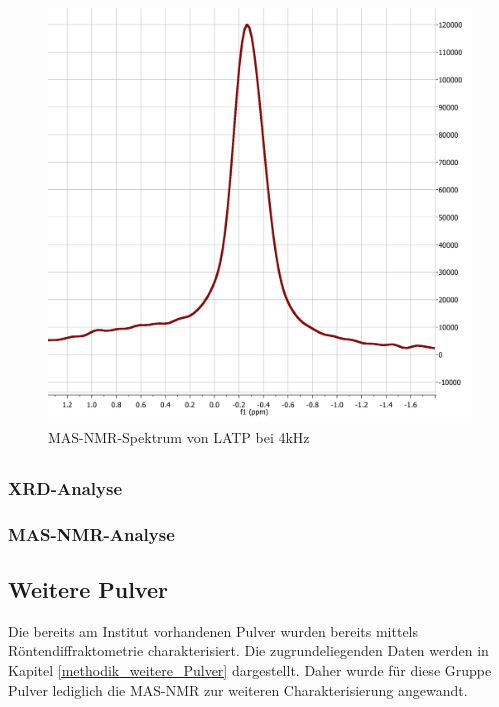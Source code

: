 \documentclass[a4paper, 11pt, headsepline,footsepline,twoside,abstract]{scrbook}
\begin{document}
\begin{figure}
	\centering
	\includegraphics[width=1.0\columnwidth]{images/P410.png}
	\caption{MAS-NMR-Spektrum von LATP bei 4kHz}
	\label{nmr_mas_LATP2}
\end{figure}
\newpage
\subsection{}
\subsubsection{XRD-Analyse}
\subsubsection{MAS-NMR-Analyse}
\subsection{Weitere Pulver}
Die bereits am Institut vorhandenen Pulver wurden bereits mittels Röntendiffraktometrie charakterisiert. Die zugrundeliegenden Daten werden in Kapitel \ref{methodik_weitere_Pulver} dargestellt. Daher wurde für diese Gruppe Pulver lediglich die MAS-NMR zur weiteren Charakterisierung angewandt.
\end{document}
